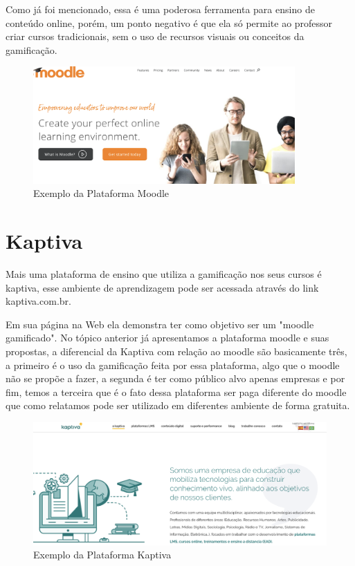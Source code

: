 Como já foi mencionado, essa é uma poderosa ferramenta para ensino de conteúdo online, porém, um ponto negativo é que ela só permite ao professor criar cursos tradicionais, sem o uso de recursos visuais ou conceitos da gamificação.

\begin{figure}[htp]
\begin{center}
  \includegraphics[width=10cm]{images/trabalhos-relacionados-img/img3-Moodle.png}
  \caption{Exemplo da Plataforma Moodle}
  \label{fig:exampleMoodle}
\end{center}
\end{figure}



\section{Kaptiva}

Mais uma plataforma de ensino que utiliza a gamificação nos seus cursos é kaptiva, esse ambiente de aprendizagem pode ser acessada através do link kaptiva.com.br.

Em sua página na Web ela demonstra ter como objetivo ser um "moodle gamificado". No tópico anterior já apresentamos a plataforma moodle e suas propostas, a diferencial da Kaptiva com relação ao moodle são basicamente três, a primeiro é o uso da gamificação feita por essa plataforma, algo que o moodle não se propõe a fazer, a segunda é ter como público alvo apenas empresas e por fim, temos a terceira que é o fato dessa plataforma ser paga diferente do moodle que como relatamos pode ser utilizado em diferentes ambiente de forma gratuita.

\begin{figure}[htp]
\begin{center}
  \includegraphics[width=15cm]{images/trabalhos-relacionados-img/img4-Kaptiva.png}
  \caption{Exemplo da Plataforma Kaptiva}
  \label{fig:exampleKaptiva}
\end{center}
\end{figure}

